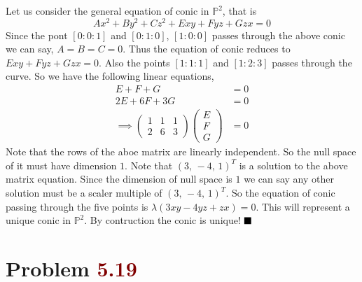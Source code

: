 \documentclass[12pt]{article}
\begin{document}
Let us consider the general equation of conic in $\mathbb{P}^2$, that is $$Ax^2+By^2+Cz^2+Exy+Fyz + G zx =0$$ Since the pont $[0:0:1]$ and $[0:1:0]$, $[1:0:0]$ passes through  the above conic we can say, $A=B=C=0$. Thus the equation of conic reduces to $E xy + Fyz+Gzx=0$. Also the points $[1:1:1]$ and $[1:2:3]$ passes through the curve. So we have the following linear equations, 
\begin{align*}
     E+F+G &=0\\
     2E+6F +3G &=0 \\
     \implies \begin{pmatrix}
        1 & 1 & 1\\
        2 & 6 & 3
     \end{pmatrix} \begin{pmatrix}
        E \\ F \\ G
     \end{pmatrix} & = 0
\end{align*}
Note that the rows of the aboe matrix are linearly independent. So the null space of it must have dimension $1$. Note that $(3, \, -4, \,1)^T$ is a solution to the above matrix equation. Since the dimension of null space is $1$ we can say any other solution must be a scaler multiple of $(3,\, -4, \,1)^T$. So the equation of conic passing through the five  points is $\lambda (3xy -4yz+zx)=0$. This will represent a unique conic in $\mathbb{P}^2$. By contruction the conic is unique! $\hfill \blacksquare$ 

\section*{Problem \textcolor{maroon}{5.19}}
\end{document}
